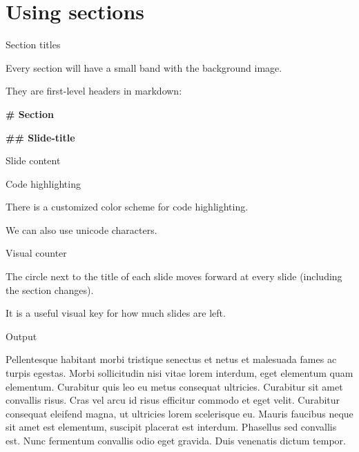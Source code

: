 \documentclass[12pt, compress, aspectratio=1610]{beamer}
\newenvironment{Shaded}{\begin{mdframed}}{\end{mdframed}}
\newcommand{\KeywordTok}[1]{\textcolor[rgb]{0.26,0.66,0.93}{\textbf{{#1}}}}
\newcommand{\FloatTok}[1]{\textcolor[HTML]{558B2F}{{#1}}}
\newcommand{\CharTok}[1]{\textcolor[HTML]{7E57C2}{{#1}}}
\newcommand{\StringTok}[1]{\textcolor[HTML]{7E57C2}{{#1}}}
\newcommand{\CommentTok}[1]{\textcolor[HTML]{546E7A}{\textit{{#1}}}}
\newcommand{\FunctionTok}[1]{\textcolor[HTML]{26A69A}{\textbf{{#1}}}}
\newcommand{\NormalTok}[1]{\textcolor[HTML]{212121}{{#1}}}
\begin{document}
\section{Using sections}\label{using-sections}

\begin{frame}[fragile]{Section titles}

Every section will have a small band with the background image.

They are first-level headers in markdown:

\begin{Shaded}
\begin{Highlighting}[]
\FunctionTok{# Section}

\FunctionTok{## Slide-title}

\NormalTok{Slide content}
\end{Highlighting}
\end{Shaded}

\end{frame}

\begin{frame}[fragile]{Code highlighting}

There is a customized color scheme for code highlighting.

\begin{Shaded}
\end{Shaded}

We can also use \alert{unicode characters}.

\end{frame}

\begin{frame}{Visual counter}

The circle next to the title of each slide moves forward at every slide
(including the section changes).

It is a useful visual key for how much slides are left.

\end{frame}

\begin{frame}{Output}

Pellentesque habitant morbi tristique senectus et netus et malesuada
fames ac turpis egestas. Morbi sollicitudin nisi vitae lorem interdum,
eget elementum quam elementum. Curabitur quis leo eu metus consequat
ultricies. Curabitur sit amet convallis risus. Cras vel arcu id risus
efficitur commodo et eget velit. Curabitur consequat eleifend magna, ut
ultricies lorem scelerisque eu. Mauris faucibus neque sit amet est
elementum, suscipit placerat est interdum. Phasellus sed convallis est.
Nunc fermentum convallis odio eget gravida. Duis venenatis dictum
tempor.

\end{frame}
\end{document}
